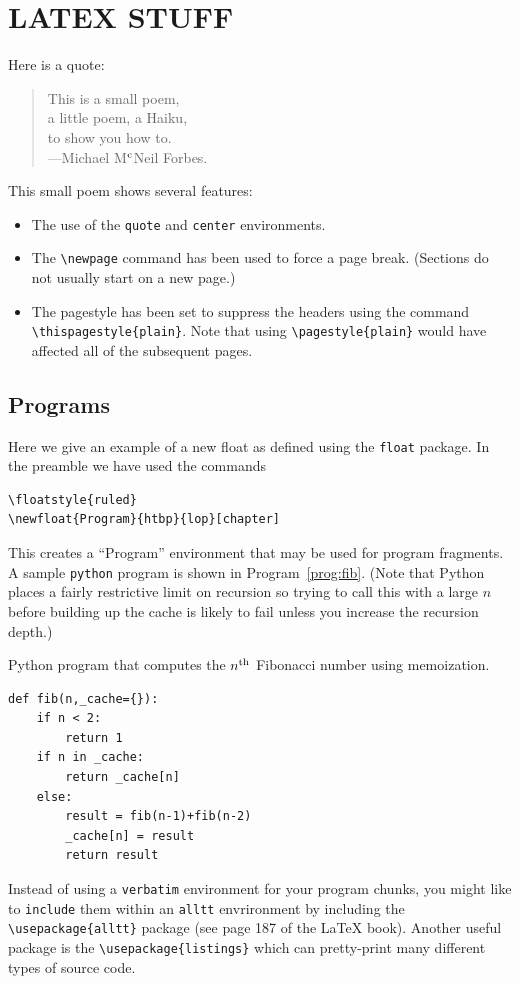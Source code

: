 \documentclass[msc,oneside]{ubcthesis}
\theoremstyle{definition}
\begin{document}
\chapter{LATEX STUFF}

Here is a quote:
\begin{quote}
  \begin{center}
    This is a small poem,\\
    a little poem, a Haiku,\\
    to show you how to.\\
    ---Michael M$^{\rm c}$Neil Forbes.
  \end{center}
\end{quote}

This small poem shows several features:
\begin{itemize}
\item The use of the \verb|quote| and \verb|center| environments.
\item The \verb|\newpage| command has been used to force a page
  break.  (Sections do not usually start on a new page.)
\item The pagestyle has been set to suppress the headers using the
  command \verb|\thispagestyle{plain}|.  Note that using
  \verb|\pagestyle{plain}| would have affected all of the subsequent
  pages.
\end{itemize}
\section{Programs}
Here we give an example of a new float as defined using the
\texttt{float} package.  In the preamble we have used the commands
\begin{verbatim}
\floatstyle{ruled}
\newfloat{Program}{htbp}{lop}[chapter]
\end{verbatim}
This creates a ``Program'' environment that may be used for program
fragments.  A sample \texttt{python} program is shown in
Program~\ref{prog:fib}.  (Note that Python places a fairly restrictive
limit on recursion so trying to call this with a large $n$ before
building up the cache is likely to fail unless you increase the
recursion depth.)
\begin{Program}
  \caption{\label{prog:fib} Python program that computes the $n^{\rm
      th}$ Fibonacci number using memoization.}
\begin{verbatim}
def fib(n,_cache={}):
    if n < 2:
        return 1
    if n in _cache:
        return _cache[n]
    else:
        result = fib(n-1)+fib(n-2)
        _cache[n] = result
        return result
\end{verbatim}
\end{Program}
Instead of using a \texttt{verbatim} environment for your program
chunks, you might like to \texttt{include} them within an
\texttt{alltt} envrironment by including the \verb|\usepackage{alltt}|
package (see page 187 of the \LaTeX{} book).  Another useful package
is the \verb|\usepackage{listings}| which can pretty-print many
different types of source code.
\end{document}
